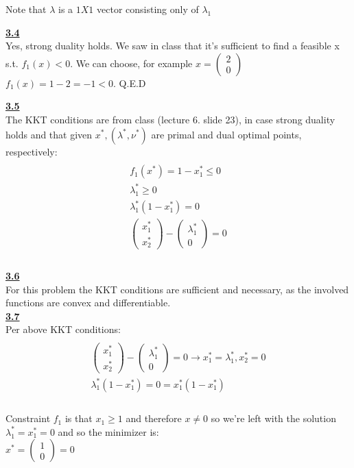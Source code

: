 \documentclass[fleqn]{article}
\begin{document}
Note that $\lambda$ is a $1X1$ vector consisting only of $\lambda_1$ 

\underline{\textbf{3.4}} \\
Yes, strong duality holds. We saw in class that it's sufficient to find a feasible x s.t. $f_1(x)<0$. We can choose, for example $x =   \begin{pmatrix}
            2 \\
            0 
         \end{pmatrix}$
$f_1(x) = 1-2=-1<0$.
Q.E.D

\underline{\textbf{3.5}} \\

The KKT conditions are from class (lecture 6. slide 23), in case strong duality holds and that given $x^*,(\lambda^*, \nu^*)$ are primal and dual optimal points, respectively: \\

\begin{multline*} \\
f_1(x^*) = 1-x_1^* \leq 0 \\
\lambda_1^* \geq 0 \\
\lambda_1^*(1-x_1^*)=0 \\
\begin{pmatrix}
	x_1^* \\ x_2^*
\end{pmatrix} -
\begin{pmatrix}
	\lambda_1^* \\ 0
\end{pmatrix}  =0 \\
\end{multline*} \\

\underline{\textbf{3.6}} \\
For this problem the KKT conditions are sufficient and necessary, as the involved functions are convex and differentiable. \\

\underline{\textbf{3.7}} \\
Per above KKT conditions: \\
\begin{multline*} \\
\begin{pmatrix}
	x_1^* \\ x_2^*
\end{pmatrix} -
\begin{pmatrix}
	\lambda_1^* \\ 0
\end{pmatrix}  =0 
\rightarrow 
x_1^*=\lambda_1^*, x_2^*=0 \\
\lambda_1^*(1-x_1^*)=0 = x_1^*(1-x_1^*) \\
\end{multline*} \\
Constraint $f_1$ is that $x_1 \geq 1$ and therefore $x \neq 0$ so we're left with the solution $\lambda_1^*=x_1^*=0$ and so the minimizer is: \\
$ x^* = 
\begin{pmatrix}
	1 \\ 0
\end{pmatrix}  =0
$
\end{document}
